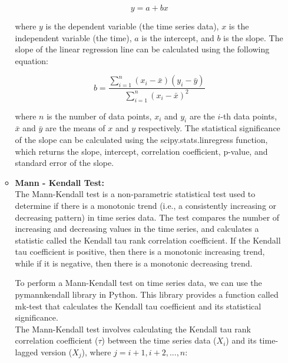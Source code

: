 \documentclass[a4paper, 12pt, twoside]{report}
\begin{document}
\begin{enumerate}
\begin{itemize}
                    \begin{equation}
                        y = a + bx
                    \end{equation}


                    where $y$ is the dependent variable (the time series data), $x$ is the independent variable (the time), $a$ is the intercept, and $b$ is the slope. The slope of the linear regression line can be calculated using the following equation:

                    \begin{equation}
                        b = \frac{\sum_{i=1}^{n} (x_i - \bar{x})(y_i - \bar{y})}{\sum_{i=1}^{n} (x_i - \bar{x})^2}
                    \end{equation}

                    where $n$ is the number of data points, $x_i$ and $y_i$ are the $i$-th data points, $\bar{x}$ and $\bar{y}$ are the means of $x$ and $y$ respectively. The statistical significance of the slope can be calculated using the {\selectfont scipy.stats}.linregress function, which returns the slope, intercept, correlation coefficient, p-value, and standard error of the slope.

              \item \textbf{Mann - Kendall Test:} \cite{pymannkendall}\\
                    The Mann-Kendall test is a non-parametric statistical test used to determine if there is a monotonic trend (i.e., a consistently increasing or decreasing pattern) in time series data. The test compares the number of increasing and decreasing values in the time series, and calculates a statistic called the Kendall tau rank correlation coefficient. If the Kendall tau coefficient is positive, then there is a monotonic increasing trend, while if it is negative, then there is a monotonic decreasing trend.

                    To perform a Mann-Kendall test on time series data, we can use the {\selectfont pymannkendall} library in Python. This library provides a function called mk-test that calculates the Kendall tau coefficient and its statistical significance. \\

                    The Mann-Kendall test involves calculating the Kendall tau rank correlation coefficient ($\tau$) between the time series data ($X_i$) and its time-lagged version ($X_j$), where $j=i+1, i+2,...,n$:


\end{itemize}
\end{enumerate}
\end{document}
